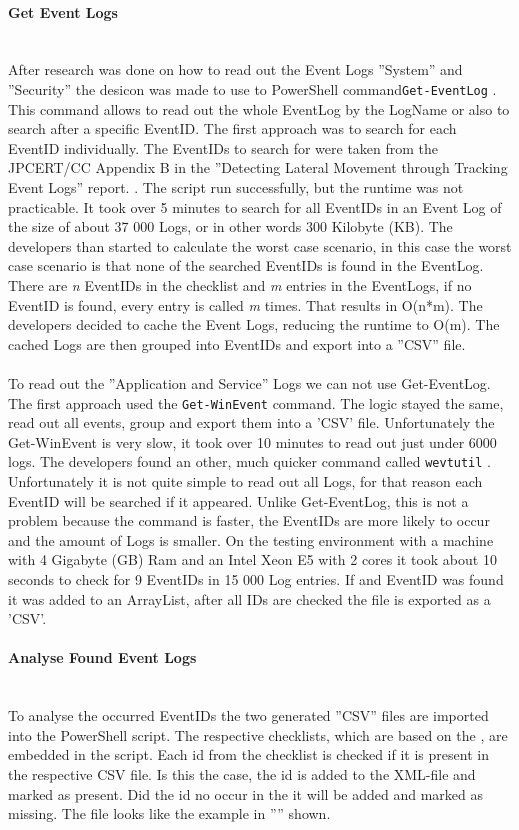 \paragraph{Get Event Logs}\ \\
After research was done on how to read out the Event Logs ''System'' and ''Security'' the desicon was made to use to PowerShell command\lstinline|Get-EventLog| \cite{Get-EventLogs}. This command allows to read out the whole EventLog by the LogName or also to search after a specific EventID. The first approach was to search for each EventID individually. The EventIDs to search for were taken from the JPCERT/CC Appendix B in the ''Detecting Lateral Movement through Tracking Event Logs'' report. \cite{JPCERTDetectingLateralMovement}. The script run successfully, but the runtime was not practicable. It took over 5 minutes to search for all EventIDs in an Event Log of the size of about 37 000 Logs, or  in other words 300 Kilobyte (KB). The developers than started to calculate the worst case scenario, in this case the worst case scenario is that none of the searched EventIDs is found in the EventLog. There are \textit{n} EventIDs in the checklist and \textit{m} entries in the EventLogs, if no EventID is found, every entry is called \textit{m} times. That results in O(n*m). The developers decided to cache the Event Logs, reducing the runtime to O(m). The cached Logs are then grouped into EventIDs and export into a ''CSV'' file. \ \\
\ \\
To read out the ''Application and Service'' Logs we can not use Get-EventLog. The first approach used the \lstinline|Get-WinEvent| \cite{Get-WinEvent} command. The logic stayed the same, read out all events, group and export them into a 'CSV' file. Unfortunately the Get-WinEvent is very slow, it took over 10 minutes to read out just under 6000 logs.
The developers found an other, much quicker command called \lstinline|wevtutil| \cite{wevtutil}. Unfortunately it is not quite simple to read out all Logs, for that reason each EventID will be searched if it appeared. Unlike Get-EventLog, this is not a problem because the command is faster, the EventIDs are more likely to occur and the amount of Logs is smaller. On the testing environment with a machine with 4 Gigabyte (GB) Ram and an Intel Xeon E5 with 2 cores it took about 10 seconds to check for 9 EventIDs in 15 000 Log entries. If and EventID was found it was added to an ArrayList, after all IDs are checked the file is exported as a 'CSV'.
\paragraph{Analyse Found Event Logs} \ \\
To analyse the occurred EventIDs the two generated ''CSV'' files are imported into the PowerShell script. The respective checklists, which are based on the , are embedded in the script. Each id from the checklist is checked if it is present in the respective CSV file. Is this the case, the id is added to the XML-file and marked as present. Did the id no occur in the it will be added and marked as missing. The file looks like the example in '''' shown.
\clearpage


